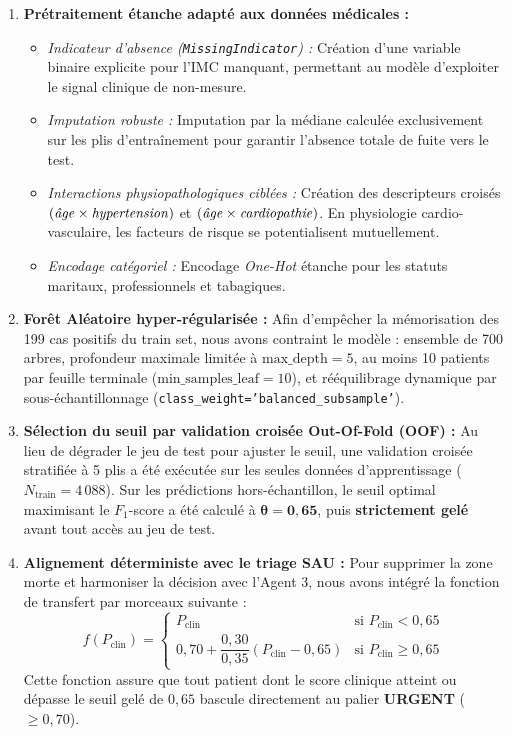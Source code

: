 \begin{enumerate}
    \item \textbf{Prétraitement étanche adapté aux données médicales :}
    \begin{itemize}
        \item \emph{Indicateur d'absence (\texttt{MissingIndicator}) :} Création d'une variable binaire explicite pour l'IMC manquant, permettant au modèle d'exploiter le signal clinique de non-mesure.
        \item \emph{Imputation robuste :} Imputation par la médiane calculée exclusivement sur les plis d'entraînement pour garantir l'absence totale de fuite vers le test.
        \item \emph{Interactions physiopathologiques ciblées :} Création des descripteurs croisés $(\text{\emph{âge}} \times \text{\emph{hypertension}})$ et $(\text{\emph{âge}} \times \text{\emph{cardiopathie}})$. En physiologie cardio-vasculaire, les facteurs de risque se potentialisent mutuellement.
        \item \emph{Encodage catégoriel :} Encodage \emph{One-Hot} étanche pour les statuts maritaux, professionnels et tabagiques.
    \end{itemize}

    \item \textbf{Forêt Aléatoire hyper-régularisée :}
    Afin d'empêcher la mémorisation des 199 cas positifs du train set, nous avons contraint le modèle : ensemble de 700 arbres, profondeur maximale limitée à $\text{max\_depth} = 5$, au moins 10 patients par feuille terminale ($\text{min\_samples\_leaf} = 10$), et rééquilibrage dynamique par sous-échantillonnage (\texttt{class\_weight='balanced\_subsample'}).

    \item \textbf{Sélection du seuil par validation croisée Out-Of-Fold (OOF) :}
    Au lieu de dégrader le jeu de test pour ajuster le seuil, une validation croisée stratifiée à 5 plis a été exécutée sur les seules données d'apprentissage ($N_{\text{train}} = 4\,088$). Sur les prédictions hors-échantillon, le seuil optimal maximisant le $F_1$-score a été calculé à $\boldsymbol{\theta = 0{,}65}$, puis \textbf{strictement gelé} avant tout accès au jeu de test.

    \item \textbf{Alignement déterministe avec le triage SAU :}
    Pour supprimer la zone morte et harmoniser la décision avec l'Agent 3, nous avons intégré la fonction de transfert par morceaux suivante :
    \begin{equation}
        f(P_{\text{clin}}) = 
        \begin{cases} 
            P_{\text{clin}} & \text{si } P_{\text{clin}} < 0{,}65 \\[6pt]
            0{,}70 + \dfrac{0{,}30}{0{,}35} \left(P_{\text{clin}} - 0{,}65\right) & \text{si } P_{\text{clin}} \ge 0{,}65
        \end{cases}
    \end{equation}
    Cette fonction assure que tout patient dont le score clinique atteint ou dépasse le seuil gelé de $0{,}65$ bascule directement au palier \textbf{URGENT} ($\ge 0{,}70$).
\end{enumerate}

